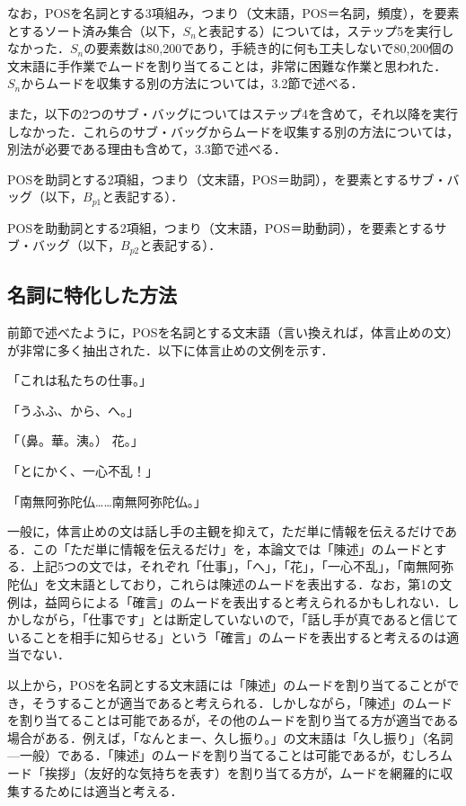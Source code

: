\documentclass[japanese]{jnlp_1.4}
\newcommand{\InHone}[1]{}
\begin{document}
\vspace{1\baselineskip}
なお，POSを名詞とする3項組み，つまり（文末語，POS＝名詞，頻度），を要素とするソート済み集合（以下，$S_{n}$と表記する）については，ステップ5を実行しなかった．$S_{n}$の要素数は80,200であり，手続き的に何も工夫しないで80,200個の文末語に手作業でムードを割り当てることは，非常に困難な作業と思われた．$S_{n}$からムードを収集する別の方法については，3.2節で述べる．

また，以下の2つのサブ・バッグについてはステップ4を含めて，それ以降を実行しなかった．これらのサブ・バッグからムードを収集する別の方法については，別法が必要である理由も含めて，3.3節で述べる．

\InHone{(a)} 
POSを助詞とする2項組，つまり（文末語，POS＝助詞），を要素とするサブ・バッグ（以下，$B_{p1}$と表記する）．

\InHone{(b)} 
POSを助動詞とする2項組，つまり（文末語，POS＝助動詞），を要素とするサブ・バッグ（以下，$B_{p2}$と表記する）．

\subsection{名詞に特化した方法}

前節で述べたように，POSを名詞とする文末語（言い換えれば，体言止めの文）が非常に多く抽出された．以下に体言止めの文例を示す．

\InHone{(1)}
「これは私たちの仕事。」

\InHone{(2)}
「うふふ、から、へ。」

\InHone{(3)}
「（鼻。華。洟。） 花。」

\InHone{(4)}
「とにかく、一心不乱！」

\InHone{(5)}
「南無阿弥陀仏……南無阿弥陀仏。」

一般に，体言止めの文は話し手の主観を抑えて，ただ単に情報を伝えるだけである．この「ただ単に情報を伝えるだけ」を，本論文では「陳述」のムードとする．上記5つの文では，それぞれ「仕事」，「へ」，「花」，「一心不乱」，「南無阿弥陀仏」を文末語としており，これらは陳述のムードを表出する．なお，第1の文例は，益岡らによる「確言」のムードを表出すると考えられるかもしれない．しかしながら，「仕事です」とは断定していないので，「話し手が真であると信じていることを相手に知らせる」という「確言」のムードを表出すると考えるのは適当でない．

以上から，POSを名詞とする文末語には「陳述」のムードを割り当てることができ，そうすることが適当であると考えられる．しかしながら，「陳述」のムードを割り当てることは可能であるが，その他のムードを割り当てる方が適当である場合がある．例えば，「なんとまー、久し振り。」の文末語は「久し振り」（名詞—一般）である．「陳述」のムードを割り当てることは可能であるが，むしろムード「挨拶」（友好的な気持ちを表す）を割り当てる方が，ムードを網羅的に収集するためには適当と考える．
\end{document}

